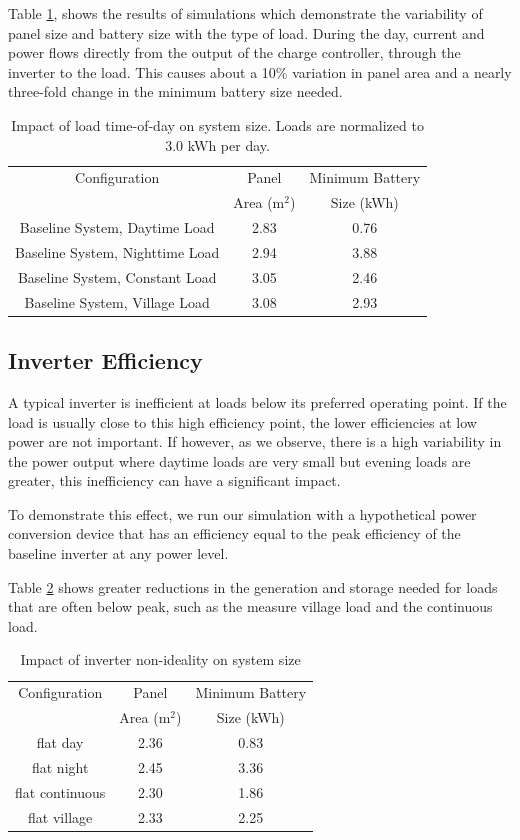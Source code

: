 \documentclass[conference]{IEEEtran}
\begin{document}
Table \ref{load_type_impact}, shows the results of simulations
which demonstrate the variability of panel size and battery
size with the type of load.
During the day, current and power flows directly from the output of
the charge controller, through the inverter to the load.
This causes about a 10\% variation in panel area and a
nearly three-fold change in the minimum battery size needed.

\begin{table}
\centering
\begin{tabular}{c c c}
Configuration & Panel          & Minimum Battery \\
              & Area (m$^2$)   & Size (kWh)      \\
\hline
Baseline System, Daytime Load   & 2.83 & 0.76 \\
Baseline System, Nighttime Load & 2.94 & 3.88 \\
Baseline System, Constant Load  & 3.05 & 2.46 \\
Baseline System, Village Load   & 3.08 & 2.93 \\
\end{tabular}
\caption{Impact of load time-of-day on system size.
Loads are normalized to 3.0 kWh per day.}
\label{load_type_impact}
\end{table}

\subsection{Inverter Efficiency}

A typical inverter is inefficient at loads below its
preferred operating point.  
If the load is usually close to this high efficiency
point, the lower efficiencies at low power are not important.
If however, as we observe, there is a high variability
in the power output where daytime loads are very small
but evening loads are greater, this inefficiency can have
a significant impact.

To demonstrate this effect, we run our simulation with 
a hypothetical power conversion device that has an 
efficiency equal to the peak efficiency of the baseline
inverter at any power level. 

Table \ref{table_inverter} shows greater reductions 
in the generation and storage needed for loads that 
are often below peak, such as the measure village load
and the continuous load.

\begin{table}
\centering
\begin{tabular}{c c c}
Configuration & Panel          & Minimum Battery \\
              & Area (m$^2$)   & Size (kWh)      \\
\hline
flat day        & 2.36 & 0.83 \\
flat night      & 2.45 & 3.36 \\
flat continuous & 2.30 & 1.86 \\
flat village    & 2.33 & 2.25 \\
\end{tabular}
\caption{Impact of inverter non-ideality on system size}
\label{table_inverter}
\end{table}
\end{document}
